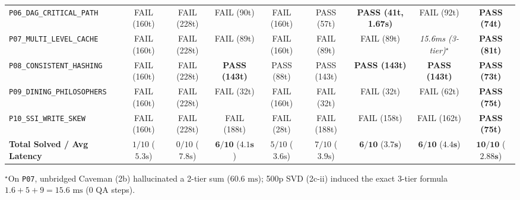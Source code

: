 \documentclass[10pt,twocolumn]{article}
\begin{document}
\begin{table}[t]
{\begin{tabular}{l|ccc|cccc|c}
\texttt{P06\_DAG\_CRITICAL\_PATH} & FAIL (160t) & FAIL (228t) & FAIL (90t) & FAIL (160t) & PASS (57t) & \textbf{PASS (41t, 1.67s)} & FAIL (92t) & \textbf{PASS (74t)} \\
\texttt{P07\_MULTI\_LEVEL\_CACHE} & FAIL (160t) & FAIL (228t) & FAIL (89t) & FAIL (160t) & FAIL (89t) & FAIL (89t) & \emph{15.6ms (3-tier)}$^\star$ & \textbf{PASS (81t)} \\
\texttt{P08\_CONSISTENT\_HASHING} & FAIL (160t) & FAIL (228t) & \textbf{PASS (143t)} & PASS (88t) & PASS (143t) & \textbf{PASS (143t)} & \textbf{PASS (143t)} & \textbf{PASS (73t)} \\
\texttt{P09\_DINING\_PHILOSOPHERS} & FAIL (160t) & FAIL (228t) & FAIL (32t) & FAIL (160t) & FAIL (32t) & FAIL (32t) & FAIL (62t) & \textbf{PASS (75t)} \\
\texttt{P10\_SSI\_WRITE\_SKEW} & FAIL (160t) & FAIL (228t) & FAIL (188t) & FAIL (28t) & FAIL (188t) & FAIL (158t) & FAIL (162t) & \textbf{PASS (75t)} \\
\midrule
\textbf{Total Solved / Avg Latency} & $1/10$ ($5.3\text{s}$) & $0/10$ ($7.8\text{s}$) & $\mathbf{6/10}$ ($\mathbf{4.1\text{s}}$) & $5/10$ ($3.6\text{s}$) & $7/10$ ($3.9\text{s}$) & $\mathbf{6/10}$ ($\mathbf{3.7\text{s}}$) & $\mathbf{6/10}$ ($\mathbf{4.4\text{s}}$) & $\mathbf{10/10}$ ($\mathbf{2.88\text{s}}$) \\
\bottomrule
\end{tabular}%
}
\vspace{2pt}\par
{\footnotesize $^\star$On \texttt{P07}, unbridged Caveman (2b) hallucinated a 2-tier sum ($60.6\text{ ms}$); 500p SVD (2c-ii) induced the exact 3-tier formula $1.6+5+9 = 15.6\text{ ms}$ ($0$ QA steps).}
\end{table}
\end{document}
